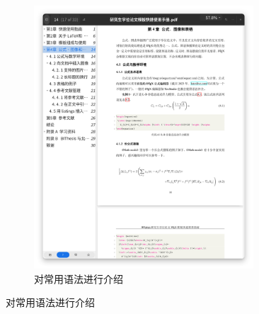 \documentclass[
  aspectratio=169,
  presentation,
  titlegraphic=./images/bit.png,
  framelogo=./images/bit.png
]{bitbeamer}
\begin{document}
\begin{frame}
\begin{figure}
\begin{subfigure}{0.40\textwidth}
      \includegraphics[width=0.9\textwidth]{images/9-2.png}
      \caption{对常用语法进行介绍}
    \end{subfigure}
  \end{figure}
   
\end{frame}
\end{document}
